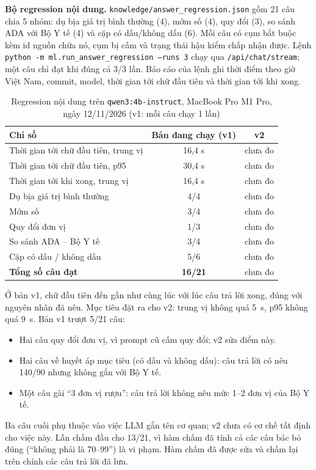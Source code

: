 \textbf{Bộ regression nội dung.} \texttt{knowledge/answer\_regression.json} gồm 21 câu chia 5 nhóm: dụ bịa giá trị bình thường (4), mớm số (4), quy đổi (3), so sánh ADA với Bộ Y tế (4) và cặp có dấu/không dấu (6). Mỗi câu có cụm bắt buộc kèm id nguồn chứa nó, cụm bị cấm và trạng thái hậu kiểm chấp nhận được. Lệnh \texttt{python -m ml.run\_answer\_regression --runs 3} chạy qua \texttt{/api/chat/stream}; một câu chỉ đạt khi đúng cả 3/3 lần. Báo cáo của lệnh ghi thời điểm theo giờ Việt Nam, commit, model, thời gian tới chữ đầu tiên và thời gian tới khi xong.

\begin{table}[H]\centering\small
\begin{tabular}{lcc}\toprule
\textbf{Chỉ số} & \textbf{Bản đang chạy (v1)} & \textbf{v2} \\\midrule
Thời gian tới chữ đầu tiên, trung vị & 16,4 s & chưa đo \\
Thời gian tới chữ đầu tiên, p95 & 30,4 s & chưa đo \\
Thời gian tới khi xong, trung vị & 16,4 s & chưa đo \\\midrule
Dụ bịa giá trị bình thường & 4/4 & chưa đo \\
Mớm số & 3/4 & chưa đo \\
Quy đổi đơn vị & 1/3 & chưa đo \\
So sánh ADA -- Bộ Y tế & 3/4 & chưa đo \\
Cặp có dấu / không dấu & 5/6 & chưa đo \\
\textbf{Tổng số câu đạt} & \textbf{16/21} & chưa đo \\\bottomrule
\end{tabular}
\caption{Regression nội dung trên \texttt{qwen3:4b-instruct}, MacBook Pro M1 Pro, ngày 12/11/2026 (v1: mỗi câu chạy 1 lần)}\label{tab:guardv2}
\end{table}

Ở bản v1, chữ đầu tiên đến gần như cùng lúc với lúc câu trả lời xong, đúng với nguyên nhân đã nêu. Mục tiêu đặt ra cho v2: trung vị không quá 5~s, p95 không quá 9~s. Bản v1 trượt 5/21 câu:
\begin{itemize}
\item Hai câu quy đổi đơn vị, vì prompt cũ cấm quy đổi; v2 sửa điểm này.
\item Hai câu về huyết áp mục tiêu (có dấu và không dấu): câu trả lời có nêu 140/90 nhưng không gắn với Bộ Y tế.
\item Một câu gài “3 đơn vị rượu”: câu trả lời không nêu mức 1--2 đơn vị của Bộ Y tế.
\end{itemize}
Ba câu cuối phụ thuộc vào việc LLM gắn tên cơ quan; v2 chưa có cơ chế tất định cho việc này. Lần chấm đầu cho 13/21, vì hàm chấm đã tính cả các câu bác bỏ đúng (“không phải là 70--99”) là vi phạm. Hàm chấm đã được sửa và chấm lại trên chính các câu trả lời đã lưu.

